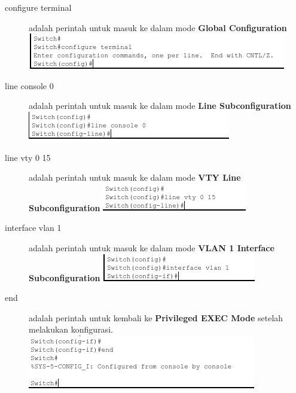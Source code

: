 \documentclass{article}
\begin{document}
\begin{flushleft}
\begin{description}
            \item[configure terminal] adalah perintah untuk masuk ke dalam mode \textbf{Global Configuration}
            \includegraphics[scale=0.9]{conft-switch.png}

            \item[line console 0] adalah perintah untuk masuk ke dalam mode \textbf{Line Subconfiguration}
            \includegraphics{line-console-switch.png}

            \item[line vty 0 15] adalah perintah untuk masuk ke dalam mode \textbf{VTY Line Subconfiguration}
            \newline
            \includegraphics{vty-line-switch.png}

            \item[interface vlan 1] adalah perintah untuk masuk ke dalam mode \textbf{VLAN 1 Interface Subconfiguration}
            \includegraphics{vlan-switch.png}

            \item[end] adalah perintah untuk kembali ke \textbf{Privileged EXEC Mode} setelah melakukan konfigurasi.
            \includegraphics{end-switch.png}


\end{description}
\end{flushleft}
\end{document}
